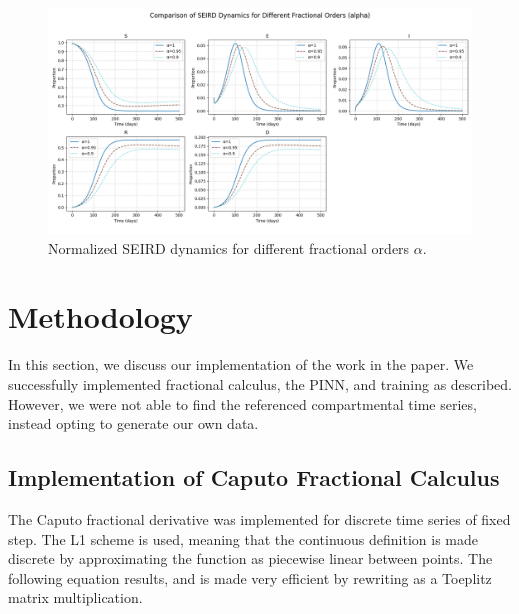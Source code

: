 \documentclass{article}
\begin{document}
	\begin{figure}
		\centering
		\includegraphics[width=\linewidth]{images/alpha_effect.png}
		\caption{Normalized SEIRD dynamics for different fractional orders $\alpha$.}
		\label{figure:alpha_effect}
	\end{figure}
	
	\section{Methodology}
	\label{section:Methodology}
	
	In this section, we discuss our implementation of the work in the paper. We successfully implemented fractional calculus, the PINN, and training as described. However, we were not able to find the referenced compartmental time series, instead opting to generate our own data.
	
	\subsection{Implementation of Caputo Fractional Calculus}
	\label{subsection:Implementation_of_Caputo_Fractional_Calculus}
	
	The Caputo fractional derivative was implemented for discrete time series of fixed step. The L1 scheme is used, meaning that the continuous definition is made discrete by approximating the function as piecewise linear between points. The following equation results, and is made very efficient by rewriting as a Toeplitz matrix multiplication.
	
\end{document}
